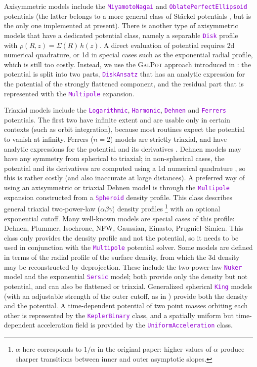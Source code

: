 \documentclass[12pt]{article}
\newcommand{\ttt}[1]{\textcolor{darkviolet}{\texttt{#1}}}
\begin{document}
Axisymmetric models include the \ttt{MiyamotoNagai} and \ttt{OblatePerfectEllipsoid} potentials (the latter belongs to a more general class of St\"ackel potentials \cite{deZeeuw1985}, but is the only one implemented at present).
There is another type of axisymmetric models that have a dedicated potential class, namely a separable \ttt{Disk} profile with $\rho(R,z) = \Sigma(R)\, h(z)$. A direct evaluation of potential requires 2d numerical quadrature, or 1d in special cases such as the exponential radial profile, which is still too costly. Instead, we use the \textsc{GalPot} approach introduced in \cite{KuijkenDubinski1995, DehnenBinney1998}: the potential is split into two parts, \ttt{DiskAnsatz} that has an analytic expression for the potential of the strongly flattened component, and the residual part that is represented with the \ttt{Multipole} expansion.

Triaxial models include the \ttt{Logarithmic}, \ttt{Harmonic}, \ttt{Dehnen} \cite{Dehnen1993} and \ttt{Ferrers} potentials. The first two have infinite extent and are usable only in certain contexts (such as orbit integration), because most routines expect the potential to vanish at infinity. Ferrers ($n=2$) models are strictly triaxial, and have analytic expressions for the potential and its derivatives \cite{Pfenniger1984}. Dehnen models may have any symmetry from spherical to triaxial; in non-spherical cases, the potential and its derivatives are computed using a 1d numerical quadrature \cite{MerrittFridman1996}, so this is rather costly (and also inaccurate at large distances). A preferred way of using an axisymmetric or triaxial Dehnen model is through the \ttt{Multipole} expansion constructed from a \ttt{Spheroid} density profile. 
This class describes general triaxial two-power-law ($\alpha\beta\gamma$) density profiles%
\footnote{$\alpha$ here corresponds to $1/\alpha$ in the original paper: higher values of $\alpha$ produce sharper transitions between inner and outer asymptotic slopes.}
\cite{Zhao1996} with an optional exponential cutoff. Many well-known models are special cases of this profile: Dehnen, Plummer, Isochrone, NFW, Gaussian, Einasto, Prugniel--Simien.
This class only provides the density profile and not the potential, so it needs to be used in conjunction with the \ttt{Multipole} potential solver. Some models are defined in terms of the radial profile of the surface density, from which the 3d density may be reconstructed by deprojection. These include the two-power-law \ttt{Nuker} model and the exponential \ttt{Sersic} model; both provide only the density but not potential, and can also be flattened or triaxial. 
Generalized spherical \ttt{King} models (with an adjustable strength of the outer cutoff, as in \cite{GielesZocchi2015}) provide both the density and the potential.
A time-dependent potential of two point masses orbiting each other is represented by the \ttt{KeplerBinary} class, and a spatially uniform but time-dependent acceleration field is provided by the \ttt{UniformAcceleration} class.
\end{document}
